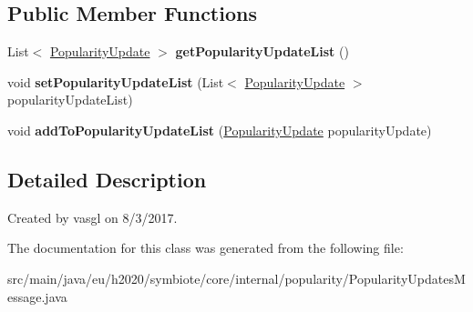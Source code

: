 \subsection*{Public Member Functions}
\begin{DoxyCompactItemize}
\item 
\mbox{\label{classeu_1_1h2020_1_1symbiote_1_1core_1_1internal_1_1popularity_1_1PopularityUpdatesMessage_a72eb57f27730b2789c1dc0aeb8065460}} 
List$<$ \hyperlink{classeu_1_1h2020_1_1symbiote_1_1core_1_1internal_1_1popularity_1_1PopularityUpdate}{Popularity\+Update} $>$ {\bfseries get\+Popularity\+Update\+List} ()
\item 
\mbox{\label{classeu_1_1h2020_1_1symbiote_1_1core_1_1internal_1_1popularity_1_1PopularityUpdatesMessage_ad057534e133536dd8c0f08dc13a6b11f}} 
void {\bfseries set\+Popularity\+Update\+List} (List$<$ \hyperlink{classeu_1_1h2020_1_1symbiote_1_1core_1_1internal_1_1popularity_1_1PopularityUpdate}{Popularity\+Update} $>$ popularity\+Update\+List)
\item 
\mbox{\label{classeu_1_1h2020_1_1symbiote_1_1core_1_1internal_1_1popularity_1_1PopularityUpdatesMessage_ad3588ec0072f809f07bf3f62628ee346}} 
void {\bfseries add\+To\+Popularity\+Update\+List} (\hyperlink{classeu_1_1h2020_1_1symbiote_1_1core_1_1internal_1_1popularity_1_1PopularityUpdate}{Popularity\+Update} popularity\+Update)
\end{DoxyCompactItemize}


\subsection{Detailed Description}
Created by vasgl on 8/3/2017. 

The documentation for this class was generated from the following file\+:\begin{DoxyCompactItemize}
\item 
src/main/java/eu/h2020/symbiote/core/internal/popularity/Popularity\+Updates\+Message.\+java\end{DoxyCompactItemize}
